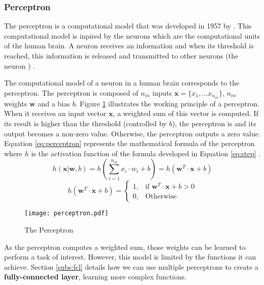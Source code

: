 \subsubsection{Perceptron} \label{subs:perceptron}
The perceptron is a computational model that was developed in 1957 by \textcite{rosenblatt_perceptron_1958}. This computational model is inpired by the neurons which are the computational units of the human brain. A neuron receives an information and when its threshold is reached, this information is released and transmitted to other neurons (the neuron ) \cite{rosenblatt_perceptron_1958, matteucci_artificial_2019}.

The computational model of a neuron in a human brain corresponds to the perceptron. The perceptron is composed of $n_{in}$ inputs $\boldsymbol{x} = \{ x_1, ... x_{n_{in}} \}$, $n_{in}$ weights $\boldsymbol{w}$ and a bias $b$. Figure \ref{fig:perceptron} illustrates the working principle of a perceptron. When it receives an input vector $\boldsymbol{x}$, a weighted sum of this vector is computed. If its result is higher than the threshold (controlled by $b$), the perceptron is  and its output becomes a non-zero value. Otherwise, the perceptron outputs a zero value.
Equation \ref{eq:perceptron} represents the mathematical formula of the perceptron where $h$ is the activation function of the formula developed in Equation \ref{eq:step} \cite{matteucci_artificial_2019}.
%
\begin{equation}
    h ( \boldsymbol{x} | \boldsymbol{w}, b) = h \left( \sum^{n_{in}}_{i=1} x_i \cdot w_i + b \right) = h \left( \boldsymbol{w}^{T} \cdot \boldsymbol{x} + b \right)
    \label{eq:perceptron}
\end{equation}
%
\begin{equation}
    h ( \boldsymbol{w}^{T} \cdot \boldsymbol{x} + b) = \begin{cases} 1, & \mbox{if } \boldsymbol{w}^{T} \cdot \boldsymbol{x} + b > 0 \\ 0, & \mbox{Otherwise} \end{cases}
    \label{eq:step}
\end{equation}
%
\begin{figure}[H]
    \centering
    \texttt{[image: perceptron.pdf]}
    \caption{The Perceptron}
    \label{fig:perceptron}
\end{figure}
%
As the perceptron computes a weighted sum, those weights can be learned to perform a task of interest. However, this model is limited by the functions it can achieve. Section \ref{subs:fcl} details how we can use multiple perceptrons to create a \textbf{fully-connected layer}, learning more complex functions.
